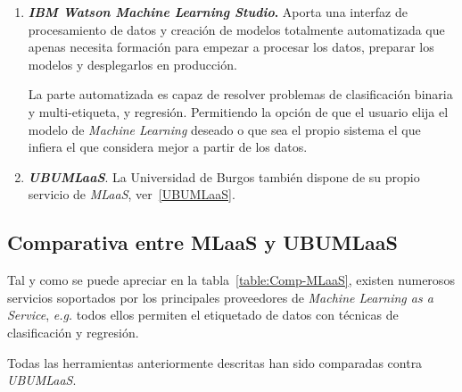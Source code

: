 \begin{enumerate}
\item \textbf{\textit{IBM Watson Machine Learning Studio}.}
Aporta una interfaz de procesamiento de datos y creación de modelos totalmente automatizada que apenas necesita formación para empezar a procesar los datos, preparar los modelos y desplegarlos en producción.

La parte automatizada es capaz de resolver problemas de clasificación binaria y multi-etiqueta, y regresión. Permitiendo la opción de que el usuario elija el modelo de \textit{Machine Learning} deseado o que sea el propio sistema el que infiera el que considera mejor a partir de los datos.

\item \textbf{\textit{UBUMLaaS}}. La Universidad de Burgos también dispone de su propio servicio de \textit{MLaaS}, ver~\ref{UBUMLaaS}.

\end{enumerate}
\clearpage
\subsection{Comparativa entre MLaaS y UBUMLaaS}
Tal y como se puede apreciar en la tabla~\ref{table:Comp-MLaaS}, existen numerosos servicios soportados por los principales proveedores de \textit{Machine Learning as a Service}, \textit{\textit{e.g.}} todos ellos permiten el etiquetado de datos con técnicas de clasificación y regresión. 

Todas las herramientas anteriormente descritas han sido comparadas contra \textit{UBUMLaaS}. 

